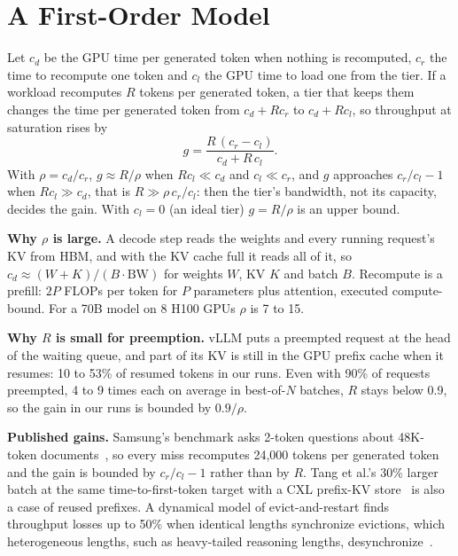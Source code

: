 \documentclass[journal]{IEEEtran}
\begin{document}
\section{A First-Order Model}
\label{sec:model}
Let $c_d$ be the GPU time per generated token when nothing is recomputed, $c_r$ the time to
recompute one token and $c_l$ the GPU time to load one from the tier. If a workload recomputes $R$
tokens per generated token, a tier that keeps them changes the time per generated token from
$c_d+Rc_r$ to $c_d+Rc_l$, so throughput at saturation rises by
\begin{equation}
g = \frac{R\,(c_r-c_l)}{c_d+R\,c_l}.
\label{eq:gain}
\end{equation}
With $\rho=c_d/c_r$, $g\approx R/\rho$ when $Rc_l\ll c_d$ and $c_l\ll c_r$, and $g$ approaches
$c_r/c_l-1$ when $Rc_l\gg c_d$, that is $R\gg\rho\,c_r/c_l$: then the tier's bandwidth, not its
capacity, decides the gain. With $c_l=0$ (an ideal tier) $g=R/\rho$ is an upper bound.

\textbf{Why $\rho$ is large.} A decode step reads the weights and every running request's KV from
HBM, and with the KV cache full it reads all of it, so $c_d \approx (W + K)/(B \cdot
\mathrm{BW})$ for weights $W$, KV $K$ and batch $B$. Recompute is a prefill: $2P$ FLOPs per token for
$P$ parameters plus attention, executed compute-bound. For a 70B model on 8 H100 GPUs $\rho$ is 7 to 15.

\textbf{Why $R$ is small for preemption.} vLLM puts a preempted request at the head of the waiting
queue, and part of its KV is still in the GPU prefix cache when it resumes: 10 to 53\% of resumed
tokens in our runs. Even with 90\% of requests preempted, 4 to 9 times each on average in
best-of-$N$ batches, $R$ stays below 0.9, so the gain in our runs is bounded by $0.9/\rho$.

\textbf{Published gains.} Samsung's benchmark asks 2-token questions about 48K-token
documents~\cite{samsung_cmmd}, so every miss recomputes 24,000 tokens per generated token and the
gain is bounded by $c_r/c_l-1$ rather than by $R$. Tang et al.'s 30\% larger batch at the same
time-to-first-token target with a CXL prefix-KV store~\cite{tang_cxl} is also a case of reused prefixes. A dynamical model of
evict-and-restart finds throughput losses up to 50\% when identical lengths synchronize evictions,
which heterogeneous lengths, such as heavy-tailed reasoning lengths, desynchronize~\cite{congestion}.
\end{document}
